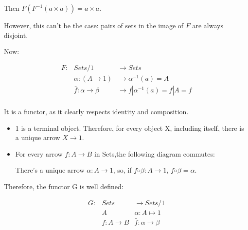 \documentclass{article}
\begin{document}
\begin{enumerate}
    Then $F(F^{-1}({a} × {a})) = {a} × {a}$.

    However, this can't be the case: pairs of sets in the image
    of $F$ are always disjoint.

    Now:

    \begin{equation}
    \begin{array}{rll}
      F : & Sets/1           & → Sets                   \\
          & α : (A → 1)      & → α^{-1}(a)   = A         \\
          & \bar{f} : α → β  & → f|α^{-1}(a) = f|A  = f  \\
    \end{array}
    \end{equation}

    It is a functor, as it clearly respects identity and composition.

    \begin{itemize}
      \item 1 is a terminal object. Therefore, for every object X,
        including itself, there is a unique arrow $X → 1$.
      \item For every arrow $f : A → B$ in Sets,the following diagram
        commutes:
        

     There's a unique arrow $α : A → 1$, so, if $f ◦ β : A → 1$,
     $f ◦ β = α$.

    \end{itemize}

    Therefore, the functor G is well defined:

    \begin{equation}
    \begin{array}{rll}
      G : & Sets             & → Sets/1         \\
          & A                & α : A ↦ 1  \\
          & f : A → B        & \bar{f} : α → β  \\
    \end{array}
    \end{equation}


\end{enumerate}
\end{document}
